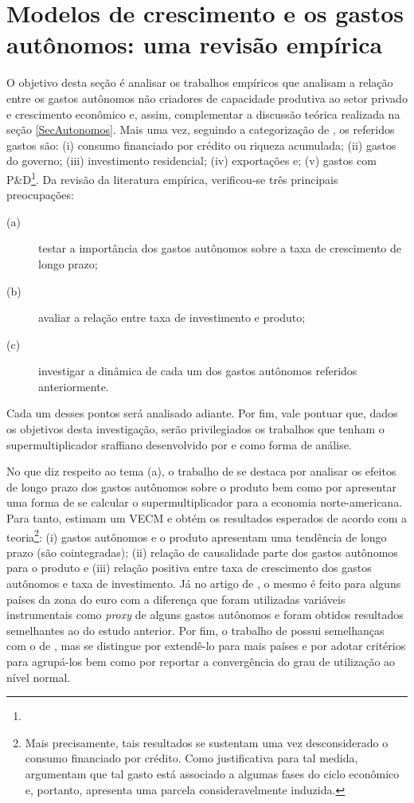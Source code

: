 \section{Modelos de crescimento e os gastos autônomos: uma revisão empírica}
\label{RevF}

O objetivo desta seção é analisar os trabalhos empíricos que analisam a relação entre os gastos autônomos não criadores de capacidade produtiva ao setor privado e crescimento econômico e, assim, complementar a discussão teórica realizada na seção \ref{SecAutonomos}. Mais uma vez, seguindo a categorização de \textcite{cesaratto_technical_2003}, os referidos gastos são:
(i) consumo financiado por crédito ou riqueza acumulada;
(ii) gastos do governo;
(iii) investimento residencial;
(iv) exportações e;
(v) gastos com P\&D\footnote{
}. 
Da revisão da literatura empírica, verificou-se três principais preocupações: 
\begin{description}
	\item[(a)] testar a importância dos gastos autônomos sobre a taxa de crescimento de longo prazo; 
	\item[(b)] avaliar a relação entre taxa de investimento e produto;
	\item[(c)] investigar a dinâmica de cada um dos gastos autônomos referidos anteriormente.
\end{description}
Cada um desses pontos será analisado adiante. Por fim, vale pontuar que, dados os objetivos desta investigação, serão privilegiados os trabalhos que tenham o supermultiplicador sraffiano desenvolvido por \textcite{serrano_long_1995} e \textcite{bortis_institutions_1996} como forma de análise.

No que diz respeito ao tema (a), o trabalho de \textcite{girardi_long-run_2016} se destaca por analisar os efeitos de longo prazo dos gastos autônomos sobre o produto bem como por apresentar uma forma de se calcular o supermultiplicador para a economia norte-americana. Para tanto, estimam um VECM e obtém os resultados esperados de acordo com a teoria\footnote{Mais precisamente, tais resultados se sustentam uma vez desconsiderado o consumo financiado por crédito. Como justificativa para tal medida, \textcite[p.~13]{girardi_long-run_2016} argumentam que tal gasto está associado a algumas fases do ciclo econômico e, portanto, apresenta uma parcela consideravelmente induzida.}: (i) gastos autônomos e o produto apresentam uma tendência de longo prazo (são cointegradas); (ii) relação de causalidade parte dos gastos autônomos para o produto e (iii) relação positiva entre taxa de crescimento dos gastos autônomos e taxa de investimento. Já no artigo de \textcite{girardi_autonomous_2018}, o mesmo é feito para alguns países da zona do euro com a diferença que foram utilizadas variáveis instrumentais como \textit{proxy} de alguns gastos autônomos e foram obtidos resultados semelhantes ao do estudo anterior. Por fim, o trabalho de \textcite{goes_supermultiplier_2018} possui semelhanças com o de \textcite{girardi_long-run_2016}, mas se distingue por extendê-lo para mais países e por adotar critérios para agrupá-los bem como por reportar a convergência do grau de utilização ao nível normal.

